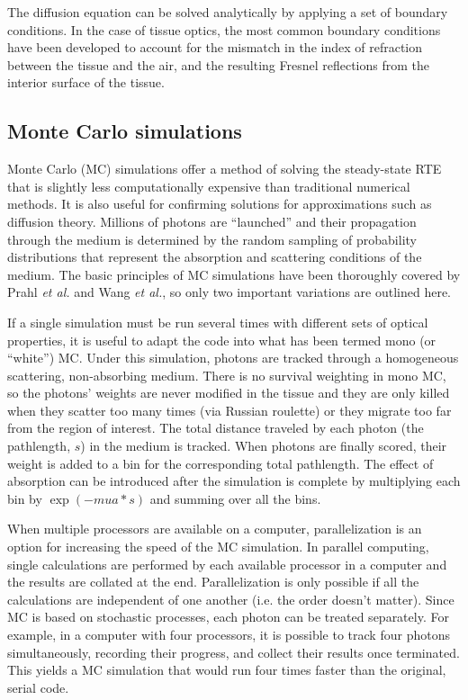 The diffusion equation can be solved analytically by applying a set of boundary conditions. In the case of tissue optics, the most common boundary conditions have been developed to account for the mismatch in the index of refraction between the tissue and the air, and the resulting Fresnel reflections from the interior surface of the tissue.

\subsection{Monte Carlo simulations}
Monte Carlo (MC) simulations offer a method of solving the steady-state RTE that is slightly less computationally expensive than traditional numerical methods. It is also useful for confirming solutions for approximations such as diffusion theory. Millions of photons are ``launched'' and their propagation through the medium is determined by the random sampling of probability distributions that represent the absorption and scattering conditions of the medium. The basic principles of MC simulations have been thoroughly covered by Prahl \emph{et al.}\cite{Prahl1989} and Wang \emph{et al.},\cite{Wang1995} so only two important variations are outlined here.

If a single simulation must be run several times with different sets of optical properties, it is useful to adapt the code into what has been termed mono (or “white”) MC.\cite{Alerstam2013} Under this simulation, photons are tracked through a homogeneous scattering, non-absorbing medium. There is no survival weighting in mono MC, so the photons' weights are never modified in the tissue and they are only killed when they scatter too many times (via Russian roulette) or they migrate too far from the region of interest. The total distance traveled by each photon (the pathlength, $s$) in the medium is tracked. When photons are finally scored, their weight is added to a bin for the corresponding total pathlength. The effect of absorption can be introduced after the simulation is complete by multiplying each bin by $\exp(-mua*s)$ and summing over all the bins.

When multiple processors are available on a computer, parallelization is an option for increasing the speed of the MC simulation. In parallel computing, single calculations are performed by each available processor in a computer and the results are collated at the end. Parallelization is only possible if all the calculations are independent of one another (i.e. the order doesn't matter). Since MC is based on stochastic processes, each photon can be treated separately. For example, in a computer with four processors, it is possible to track four photons simultaneously, recording their progress, and collect their results once terminated. This yields a MC simulation that would run four times faster than the original, serial code.

